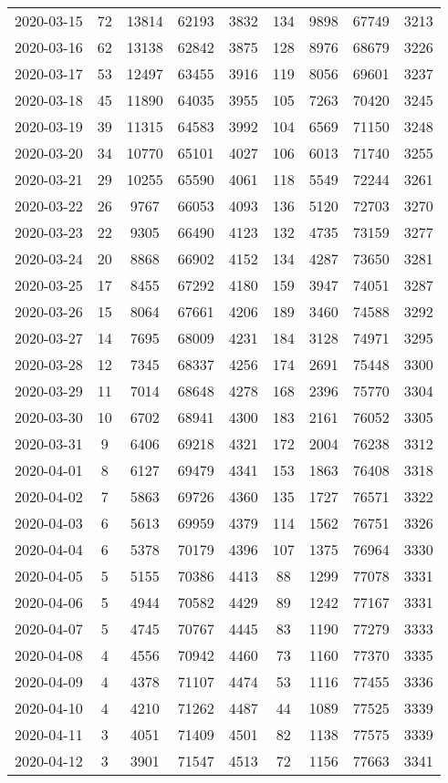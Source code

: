 \begin{longtable}{ccccccccc}
2020-03-15&72&13814&62193&3832&134&9898&67749&3213\\
2020-03-16&62&13138&62842&3875&128&8976&68679&3226\\
2020-03-17&53&12497&63455&3916&119&8056&69601&3237\\
2020-03-18&45&11890&64035&3955&105&7263&70420&3245\\
2020-03-19&39&11315&64583&3992&104&6569&71150&3248\\
2020-03-20&34&10770&65101&4027&106&6013&71740&3255\\
2020-03-21&29&10255&65590&4061&118&5549&72244&3261\\
2020-03-22&26&9767&66053&4093&136&5120&72703&3270\\
2020-03-23&22&9305&66490&4123&132&4735&73159&3277\\
2020-03-24&20&8868&66902&4152&134&4287&73650&3281\\
2020-03-25&17&8455&67292&4180&159&3947&74051&3287\\
2020-03-26&15&8064&67661&4206&189&3460&74588&3292\\
2020-03-27&14&7695&68009&4231&184&3128&74971&3295\\
2020-03-28&12&7345&68337&4256&174&2691&75448&3300\\
2020-03-29&11&7014&68648&4278&168&2396&75770&3304\\
2020-03-30&10&6702&68941&4300&183&2161&76052&3305\\
2020-03-31&9&6406&69218&4321&172&2004&76238&3312\\
2020-04-01&8&6127&69479&4341&153&1863&76408&3318\\
2020-04-02&7&5863&69726&4360&135&1727&76571&3322\\
2020-04-03&6&5613&69959&4379&114&1562&76751&3326\\
2020-04-04&6&5378&70179&4396&107&1375&76964&3330\\
2020-04-05&5&5155&70386&4413&88&1299&77078&3331\\
2020-04-06&5&4944&70582&4429&89&1242&77167&3331\\
2020-04-07&5&4745&70767&4445&83&1190&77279&3333\\
2020-04-08&4&4556&70942&4460&73&1160&77370&3335\\
2020-04-09&4&4378&71107&4474&53&1116&77455&3336\\
2020-04-10&4&4210&71262&4487&44&1089&77525&3339\\
2020-04-11&3&4051&71409&4501&82&1138&77575&3339\\
2020-04-12&3&3901&71547&4513&72&1156&77663&3341\\

\end{longtable}
